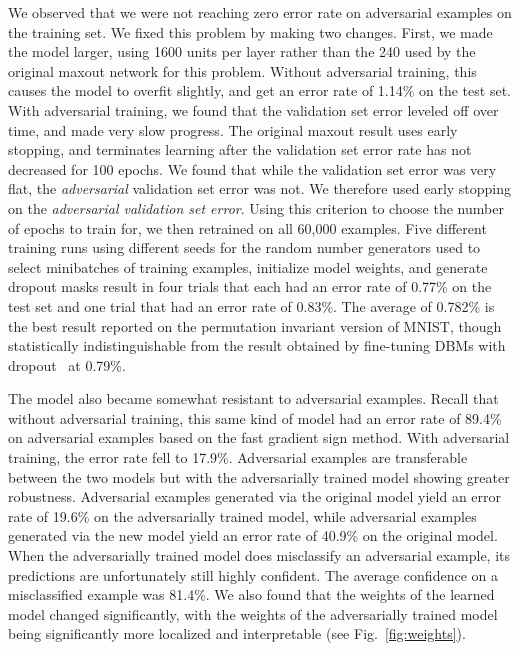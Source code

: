 \documentclass{article} %
\begin{document}
We observed that we were not reaching zero error rate on adversarial examples on the
training set. We fixed this problem by making two changes. First, we made the model
larger, using 1600 units per layer rather than the 240 used by the original maxout network
for this problem. Without adversarial training, this causes the model to overfit slightly,
and get an error rate of 1.14\% on the test set. With adversarial training, we found that
the validation set error leveled off over time, and made very slow progress. The original
maxout result uses early stopping, and terminates learning after the validation set error
rate has not decreased for 100 epochs. We found that while the validation set error was
very flat, the {\em adversarial } validation set error was not. We therefore used early
stopping on the {\em adversarial validation set error}. Using this criterion to choose
the number of epochs to train for, we then retrained on all 60,000 examples. Five different
training runs using different seeds for the random number generators used to select minibatches
of training examples, initialize model weights, and generate dropout masks result in
four trials that each had an error rate of 0.77\% on the test set and one trial that had
an error rate of 0.83\%. The average of 0.782\% is the best result reported on the permutation
invariant version of MNIST, though statistically indistinguishable from the result obtained
by fine-tuning DBMs with dropout~\citep{dropout} at 0.79\%.

The model also became somewhat resistant to adversarial examples. Recall that without
adversarial training, this same kind of model had an error rate of 89.4\% on adversarial
examples based on the fast gradient sign method. With adversarial training, the error rate
fell to 17.9\%. Adversarial examples are transferable between the two models but with the
adversarially trained model showing greater robustness. Adversarial examples generated via
the original model yield an error rate of 19.6\% on the adversarially trained model, while
adversarial examples generated via the new model yield an error rate of 40.9\% on the original
model. When the adversarially trained model does misclassify an adversarial example, its
predictions are unfortunately still highly confident. The average confidence on a misclassified
example was 81.4\%. We also found that the weights of the learned model changed significantly,
with the weights of the adversarially trained model being significantly more localized and
interpretable (see Fig.~\ref{fig:weights}).
\end{document}
